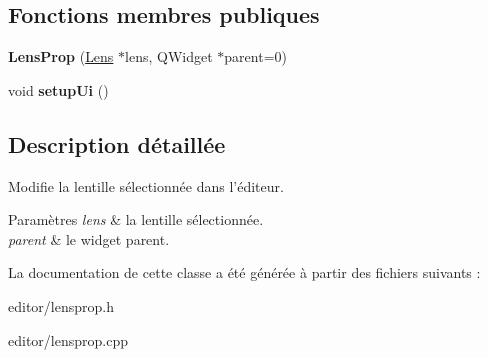 \subsection*{Fonctions membres publiques}
\begin{DoxyCompactItemize}
\item 
\hypertarget{classLensProp_a2a9f54d768d72f8ad69e1572259d2a85}{{\bfseries Lens\+Prop} (\hyperlink{classLens}{Lens} $\ast$lens, Q\+Widget $\ast$parent=0)}\label{classLensProp_a2a9f54d768d72f8ad69e1572259d2a85}

\item 
\hypertarget{classLensProp_a4b21de75fded3126b60dd75e17811e97}{void {\bfseries setup\+Ui} ()}\label{classLensProp_a4b21de75fded3126b60dd75e17811e97}

\end{DoxyCompactItemize}


\subsection{Description détaillée}
Modifie la lentille sélectionnée dans l’éditeur. 


\begin{DoxyParams}{Paramètres}
{\em lens} & la lentille sélectionnée. \\
\hline
{\em parent} & le widget parent. \\
\hline
\end{DoxyParams}


La documentation de cette classe a été générée à partir des fichiers suivants \+:\begin{DoxyCompactItemize}
\item 
editor/lensprop.\+h\item 
editor/lensprop.\+cpp\end{DoxyCompactItemize}
